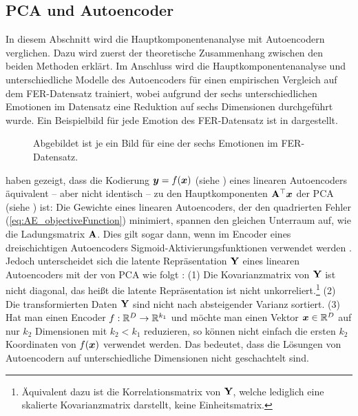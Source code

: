 \subsection{PCA und Autoencoder}
\label{ch:Vergleich:sec:Resultate:PCA_AE}

In diesem Abschnitt wird die Hauptkomponentenanalyse mit Autoencodern verglichen. Dazu wird zuerst
der theoretische Zusammenhang zwischen den beiden Methoden erklärt. Im Anschluss wird die
Hauptkomponentenanalyse und unterschiedliche Modelle des Autoencoders für einen empirischen
Vergleich auf dem FER-Datensatz trainiert, wobei aufgrund der sechs unterschiedlichen Emotionen im
Datensatz eine Reduktion auf sechs Dimensionen durchgeführt wurde. Ein Beispielbild für jede
Emotion des FER-Datensatz ist in  dargestellt.

\begin{figure}[ht]
	\centering
	
	\caption[Beispielbilder des FER-Datensatzes]{Abgebildet ist je ein Bild für eine der sechs Emotionen im FER-Datensatz.}
	\label{fig:FER-Datensatz-Beispiele}
\end{figure}

\textcites{Baldi.1989}{Bourlard.1988} haben gezeigt, dass die Kodierung $\bm{y} = f(\bm{x})$ (siehe ) eines linearen Autoencoders äquivalent -- aber nicht identisch -- zu den Hauptkomponenten $\mathbf{A}^\top\bm{x}$ der PCA (siehe ) ist: Die Gewichte eines linearen Autoencoders, der den quadrierten Fehler (\eqref{eq:AE_objectiveFunction}) minimiert, spannen den gleichen Unterraum auf, wie die Ladungsmatrix $\mathbf{A}$. Dies gilt sogar dann, wenn im Encoder eines dreischichtigen Autoencoders Sigmoid-Aktivierungsfunktionen verwendet werden \parencite[291, 293]{Bourlard.1988}. Jedoch unterscheidet sich die latente Repräsentation $\mathbf{Y}$
eines linearen Autoencoders mit der von PCA wie folgt \parencite[3]{Plaut.2018}: (1) Die Kovarianzmatrix von $\mathbf{Y}$ ist nicht diagonal, das heißt die
latente Repräsentation ist nicht unkorreliert.\footnote{Äquivalent dazu ist die Korrelationsmatrix
	von $\mathbf{Y}$, welche lediglich eine skalierte Kovarianzmatrix darstellt, keine Einheitsmatrix.}
(2) Die transformierten Daten $\mathbf{Y}$ sind nicht nach absteigender Varianz sortiert. (3) Hat man
einen Encoder $f: \mathbb{R}^D \rightarrow \mathbb{R}^{k_1}$ und möchte man einen Vektor $\bm{x} \in
	\mathbb{R}^D$ auf nur $k_2$ Dimensionen mit $k_2 < k_1$ reduzieren, so können nicht einfach die ersten
$k_2$ Koordinaten von $f(\bm{x})$ verwendet werden. Das bedeutet, dass die Lösungen von
Autoencodern auf unterschiedliche Dimensionen nicht geschachtelt sind.

